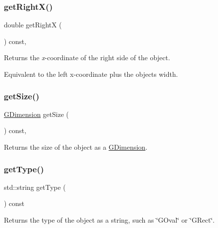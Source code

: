 \subsubsection{\texorpdfstring{get\+Right\+X()}{getRightX()}}
{\footnotesize\ttfamily double get\+RightX (\begin{DoxyParamCaption}{ }\end{DoxyParamCaption}) const\hspace{0.3cm}{\ttfamily [virtual]}, {\ttfamily [inherited]}}



Returns the {\itshape x}-\/coordinate of the right side of the object. 

Equivalent to the left x-\/coordinate plus the object\textquotesingle{}s width. \mbox{\label{classGObject_a7b4eec96a2bdc6420695d5796a78eea9}} 
\subsubsection{\texorpdfstring{get\+Size()}{getSize()}}
{\footnotesize\ttfamily \mbox{\hyperlink{classGDimension}{G\+Dimension}} get\+Size (\begin{DoxyParamCaption}{ }\end{DoxyParamCaption}) const\hspace{0.3cm}{\ttfamily [virtual]}, {\ttfamily [inherited]}}



Returns the size of the object as a {\ttfamily \mbox{\hyperlink{classGDimension}{G\+Dimension}}}. 

\mbox{\label{classGCompound_a9896d58fcfebbf1025aeeb5b8b9ede80}} 
\subsubsection{\texorpdfstring{get\+Type()}{getType()}}
{\footnotesize\ttfamily std\+::string get\+Type (\begin{DoxyParamCaption}{ }\end{DoxyParamCaption}) const\hspace{0.3cm}{\ttfamily [virtual]}}



Returns the type of the object as a string, such as {\ttfamily \char`\"{}\+G\+Oval\char`\"{}} or {\ttfamily \char`\"{}\+G\+Rect\char`\"{}}. 

